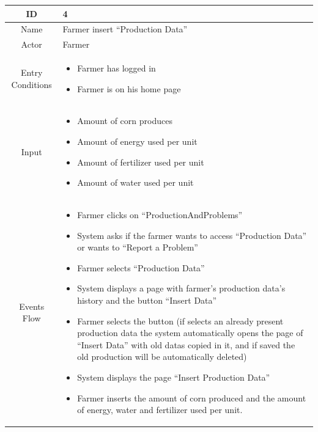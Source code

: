 \documentclass{article}
\begin{document}
\begin{center}
    \begin{longtable}{|c| p{10cm}|}
        \hline
            ID & 4 \\
        \hline
            Name & Farmer insert “Production Data” \\
        \hline
            Actor & Farmer \\
        \hline
            Entry Conditions & 
                                \begin{itemize}
                                    \item Farmer has logged in
                                    \item Farmer is on his home page
                                \end{itemize}\\
        \hline
            Input & \begin{itemize}
                        \item Amount of corn produces
                        \item Amount of energy used per unit
                        \item Amount of fertilizer used per unit
                        \item Amount of water used per unit
                    \end{itemize} \\
        \hline
            Events Flow &   \begin{itemize}
                                \item Farmer clicks on “ProductionAndProblems” 
                                \item System asks if the farmer wants to access “Production Data” or wants to “Report a Problem”
                                \item Farmer selects “Production Data”
                                \item System displays a page with farmer’s production data’s history and the button “Insert Data”
                                \item Farmer selects the button (if selects an already present production data the system automatically opens the page of “Insert Data” with old datas copied in it, and if saved the old production will be automatically deleted)
                                \item System displays the page “Insert Production Data”
                                \item Farmer inserts the amount of corn produced and the amount of energy, water and fertilizer used per unit.

\end{itemize}
\end{longtable}
\end{center}
\end{document}
